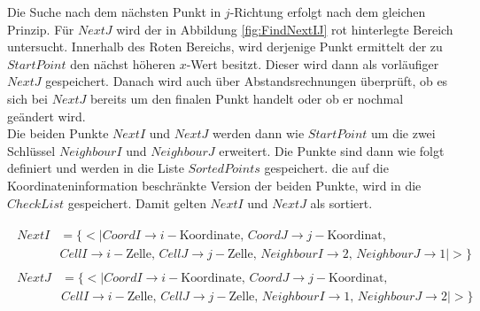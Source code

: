 Die Suche nach dem nächsten Punkt in $j$-Richtung erfolgt nach dem gleichen Prinzip. Für $NextJ$ wird der in Abbildung \ref{fig:FindNextIJ} rot hinterlegte Bereich untersucht. Innerhalb des Roten Bereichs, wird derjenige Punkt ermittelt der zu $StartPoint$ den nächst höheren $x$-Wert besitzt. Dieser wird dann als vorläufiger $NextJ$ gespeichert. Danach wird auch über Abstandsrechnungen überprüft, ob es sich bei $NextJ$ bereits um den finalen Punkt handelt oder ob er nochmal geändert wird.\\

Die beiden Punkte $NextI$ und $NextJ$ werden dann wie $StartPoint$ um die zwei Schlüssel $NeighbourI$ und $NeighbourJ$ erweitert. Die Punkte sind dann wie folgt definiert und werden in die Liste $SortedPoints$ gespeichert. die auf die Koordinateninformation beschränkte Version der beiden Punkte, wird in die $CheckList$ gespeichert. Damit gelten $NextI$ und $NextJ$ als sortiert.


\begin{gather*}
	\begin{split}
		NextI &= \{ <|CoordI \rightarrow i-\text{Koordinate},\, CoordJ \rightarrow j-\text{Koordinat},\, \\
		&CellI \rightarrow i-\text{Zelle},\, CellJ \rightarrow j-\text{Zelle},\,
		NeighbourI \rightarrow 2, \,NeighbourJ \rightarrow 1  |>\}
	\end{split}\\
	\begin{split}
	NextJ &= \{ <|CoordI \rightarrow i-\text{Koordinate},\, CoordJ \rightarrow j-\text{Koordinat},\, \\
	&CellI \rightarrow i-\text{Zelle},\, CellJ \rightarrow j-\text{Zelle},\,
	NeighbourI \rightarrow 1, \,NeighbourJ \rightarrow 2 |>\}
\end{split}
\end{gather*}




